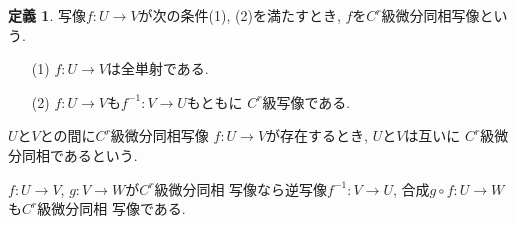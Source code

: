 \documentclass[a4j,12pt]{jarticle}
\theoremstyle{definition}
\newtheorem{definition}[theorem]{定義}
\begin{document}
\begin{definition}\label{def:C^r diffeomorphism}
    写像$f:U\to V$が次の条件(1), (2)を満たすとき, 
    $f$を$C^r$級微分同相写像という. 
    \begin{itemize}
        \item[(1)]
        $f:U\to V$は全単射である. 
        \item[(2)]
        $f:U\to V$も$f^{-1}:V\to U$もともに
        $C^r$級写像である. 
    \end{itemize}

    $U$と$V$との間に$C^r$級微分同相写像
$f:U\to V$が存在するとき, $U$と$V$は互いに
$C^r$級微分同相であるという.
\end{definition}
$f:U\to V$, $g:V\to W$が$C^r$級微分同相
写像なら逆写像$f^{-1}:V\to U$, 
合成$g\circ f:U\to W$も$C^r$級微分同相
写像である. 
 
\end{document}
